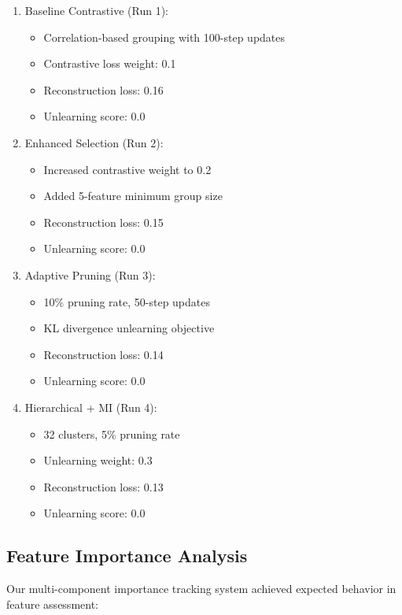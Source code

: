 \documentclass{article} %
\begin{document}
\begin{enumerate}
    \item Baseline Contrastive (Run 1):
    \begin{itemize}
        \item Correlation-based grouping with 100-step updates
        \item Contrastive loss weight: 0.1
        \item Reconstruction loss: 0.16
        \item Unlearning score: 0.0
    \end{itemize}
    
    \item Enhanced Selection (Run 2):
    \begin{itemize}
        \item Increased contrastive weight to 0.2
        \item Added 5-feature minimum group size
        \item Reconstruction loss: 0.15
        \item Unlearning score: 0.0
    \end{itemize}
    
    \item Adaptive Pruning (Run 3):
    \begin{itemize}
        \item 10\% pruning rate, 50-step updates
        \item KL divergence unlearning objective
        \item Reconstruction loss: 0.14
        \item Unlearning score: 0.0
    \end{itemize}
    
    \item Hierarchical + MI (Run 4):
    \begin{itemize}
        \item 32 clusters, 5\% pruning rate
        \item Unlearning weight: 0.3
        \item Reconstruction loss: 0.13
        \item Unlearning score: 0.0
    \end{itemize}
\end{enumerate}

\subsection{Feature Importance Analysis}
Our multi-component importance tracking system achieved expected behavior in feature assessment:
\end{document}
